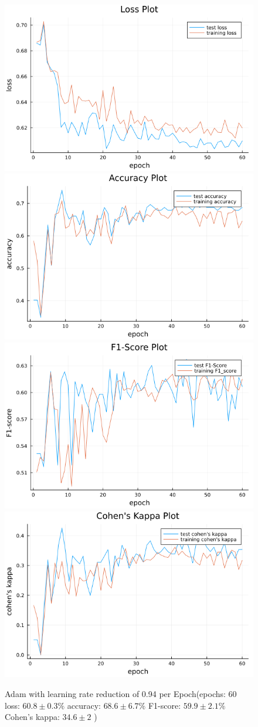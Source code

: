\documentclass[
a4paper, 
12pt,
grayscalebody, %
abstract=on,
twoside, BCOR10mm, 12pt, DIV13,headinclude, footexclude, final, abstracton, openright
]{ibireprt}
\numberwithin{equation}{chapter}
\numberwithin{table}{chapter}
\numberwithin{figure}{chapter}
\numberwithin{algorithm}{chapter}
\numberwithin{example}{chapter}
\numberwithin{example}{chapter}
\begin{document}
\begin{figure}[h]
	\includegraphics[width=0.4\linewidth]{loss_png_11_2.png}\hfill
	\includegraphics[width=0.4\linewidth]{accuracy_png_11_2.png}
	\\[\smallskipamount]
	\includegraphics[width=0.4\linewidth]{f1_score_png_11_2.png}\hfill
	\includegraphics[width=0.4\linewidth]{cohens_kappa_png_11_2.png}
	\caption{Adam with learning rate reduction of 0.94 per Epoch(epochs: 60 loss: $60.8\pm 0.3\% $ accuracy: $68.6\pm6.7\%$ F1-score: $59.9\pm2.1\%$  Cohen's kappa: $34.6\pm2$ )}
\end{figure}%
\end{document}
